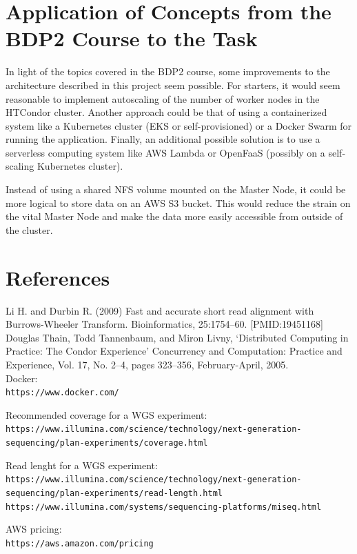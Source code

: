 \documentclass{article}
\begin{document}
\section{Application of Concepts from the BDP2 Course to the Task}
In light of the topics covered in the BDP2 course, some improvements to the architecture described in this project seem possible.
For starters, it would seem reasonable to implement autoscaling of the number of worker nodes in the HTCondor cluster.
Another approach could be that of using a containerized system like a Kubernetes cluster (EKS or self-provisioned) or a Docker Swarm for running the application.
Finally, an additional possible solution is to use a serverless computing system like AWS Lambda or OpenFaaS (possibly on a self-scaling Kubernetes cluster).

Instead of using a shared NFS volume mounted on the Master Node, it could be more logical to store data on an AWS S3 bucket.
This would reduce the strain on the vital Master Node and make the data more easily accessible from outside of the cluster.

\section{References}
Li H. and Durbin R. (2009) Fast and accurate short read alignment with Burrows-Wheeler Transform. Bioinformatics, 25:1754--60. [PMID:\@ 19451168]\\

Douglas Thain, Todd Tannenbaum, and Miron Livny, `Distributed Computing in Practice: The Condor Experience' Concurrency and Computation: Practice and Experience, Vol. 17, No. 2--4, pages 323--356, February-April, 2005.\\

Docker:\\
\texttt{https://www.docker.com/}

Recommended coverage for a WGS experiment:\\
\texttt{https://www.illumina.com/science/technology/next-generation-sequencing/plan-experiments/coverage.html}

Read lenght for a WGS experiment:\\
\texttt{https://www.illumina.com/science/technology/next-generation-sequencing/plan-experiments/read-length.html}\\
\texttt{https://www.illumina.com/systems/sequencing-platforms/miseq.html}

AWS pricing:\\
\texttt{https://aws.amazon.com/pricing}
\end{document}
